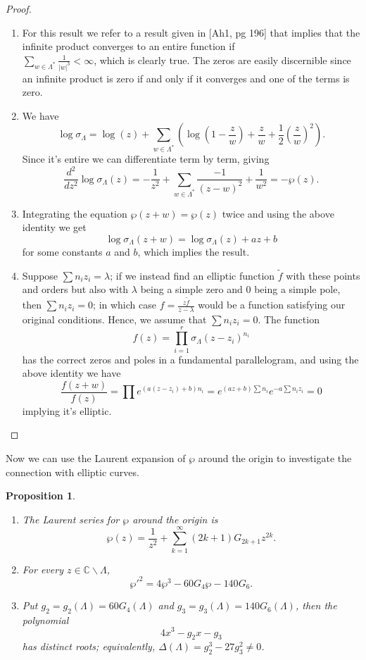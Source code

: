 \documentclass{article}
\newtheorem{proposition}{Proposition}
\theoremstyle{remark}
\begin{document}
\begin{proof}
\begin{enumerate}
\item For this result we refer to a result given in [Ah1, pg 196] that implies that the infinite product converges to an entire function if\\ $\sum_{w\in\Lambda^*}\frac{1}{|w|^3}<\infty$, which is clearly true. The zeros are easily discernible since an infinite product is zero if and only if it converges and one of the terms is zero.
\item We have
\[\log\sigma_\Lambda = \log(z) +\sum_{w\in\Lambda^*}\left( \log\left(1-\frac{z}{w}\right)+\frac{z}{w}+\frac{1}{2}\left(\frac{z}{w}\right)^2 \right). \]
Since it's entire we can differentiate term by term, giving
\[\frac{d^2}{dz^2}\log\sigma_\Lambda (z)= -\frac{1}{z^2}+\sum_{w\in\Lambda^*}\frac{-1}{(z-w)^2}+\frac{1}{w^2}=-\wp(z).  \]
\item Integrating the equation $\wp(z+w)=\wp(z)$ twice and using the above identity we get
\[\log\sigma_\Lambda(z+w)=\log\sigma_\Lambda(z)+az+b\]
for some constants $a$ and $b$, which implies the result.
\item Suppose $\sum n_i z_i=\lambda$; if we instead find an elliptic function $\tilde{f}$ with these points and orders but also with $\lambda$ being a simple zero and $0$ being a simple pole, then $\sum n_i z_i=0$; in which case $f=\frac{z\tilde{f}}{z-\lambda}$ would be a function satisfying our original conditions. Hence, we assume that $\sum n_i z_i=0$. The function
\[ f(z)=\prod_{i=1}^r\sigma_\Lambda (z-z_i)^{n_i}\]
has the correct zeros and poles in a fundamental parallelogram, and using the above identity we have
\[\frac{f(z+w)}{f(z)}=\prod e^{(a(z-z_i)+b)n_i} =e^{(az+b)\sum n_i}e^{-a\sum n_i z_i}=0\]
implying it's elliptic.
\end{enumerate}
\end{proof}
Now we can use the Laurent expansion of $\wp$ around the origin to investigate the connection with elliptic curves.
\begin{proposition}
\begin{enumerate}
\item The Laurent series for $\wp$ around the origin is 
\[\wp(z)=\frac{1}{z^2}+\sum_{k=1}^{\infty}(2k+1)G_{2k+1}z^{2k}.  \]
\item For every $z\in\mathbb{C}\backslash\Lambda$,
\[\wp'^2=4\wp^3-60G_4\wp-140G_6. \]
\item Put $g_2=g_2(\Lambda)=60G_4(\Lambda)$ and $g_3=g_3(\Lambda)=140G_6(\Lambda)$, then the polynomial
\[4x^3-g_2x-g_3\] has distinct roots; equivalently, $\Delta(\Lambda)=g_2^3-27g_3^2\neq0$.
\end{enumerate}
\end{proposition}
\end{document}
